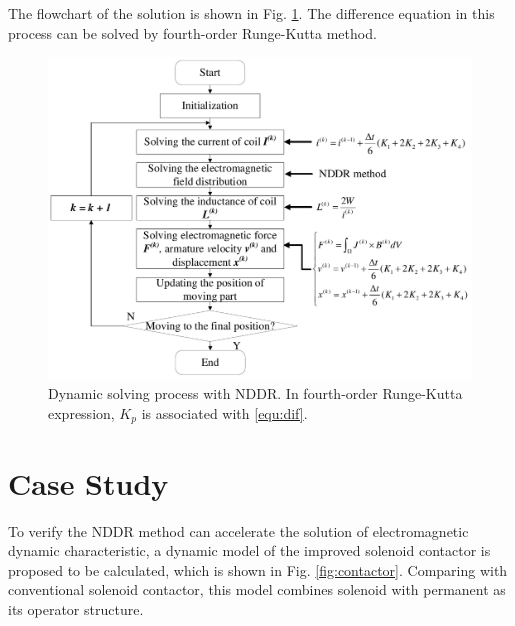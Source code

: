 \documentclass[journal,transmag]{IEEEtran}
\begin{document}
The flowchart of the solution is shown in Fig. \ref{fig:flowchart}. The difference equation in this process can be solved by fourth-order Runge-Kutta method.
\begin{figure}
	\centering
	\includegraphics[width=1.0\linewidth]{flowchart2.pdf}
	\caption{Dynamic solving process with NDDR. In fourth-order Runge-Kutta expression, $K_p$ is associated with \eqref{equ:dif}.}
	\label{fig:flowchart}
\end{figure}

\section{Case Study}
To verify the NDDR method can accelerate the solution of electromagnetic dynamic characteristic, a dynamic model of the improved solenoid contactor is proposed to be calculated, which is shown in Fig. \ref{fig:contactor}. Comparing with conventional solenoid contactor, this model combines solenoid with permanent as its operator structure. 
\end{document}
